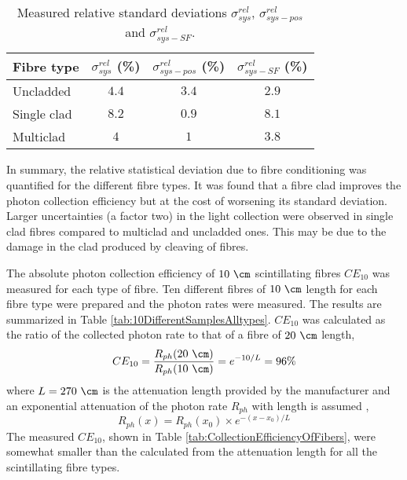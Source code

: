 \begin{table}[htbp]
\centering{}%
\begin{tabular}{lccc}
\toprule 
Fibre type & $\sigma^{rel}_{sys}$ (\%) & $\sigma^{rel}_{sys-pos}$ (\%) & $\sigma^{rel}_{sys-SF}$ (\%) \tabularnewline
\midrule
\midrule 
Uncladded & $4.4$ & $3.4$ & $2.9$ \tabularnewline
Single clad & $8.2$ & $0.9$ & $8.1$ \tabularnewline
Multiclad & $4$ & $1$ & $3.8$ \tabularnewline
\bottomrule
\end{tabular}
\caption{Measured relative standard deviations $\sigma^{rel}_{sys}$, $\sigma^{rel}_{sys-pos}$ and $\sigma^{rel}_{sys-SF}$.}
\label{tab:RelativeStandardDeviations}
\end{table}

In summary, the relative statistical deviation due to fibre conditioning was quantified for the different fibre types. It was found that a fibre clad improves the photon collection efficiency but at the cost of worsening its standard deviation. Larger uncertainties (a factor two) in the light collection were observed in single clad fibres compared to multiclad and uncladded ones. This may be due to the damage in the clad produced by cleaving of fibres. %

The absolute photon collection efficiency of $10~\cm$ scintillating fibres $CE_{10}$ was measured for each type of fibre. Ten different fibres of $10~\cm$ length for each fibre type were prepared and the photon rates were measured. The results are summarized in Table \ref{tab:10DifferentSamplesAlltypes}. $CE_{10}$ was calculated as the ratio of the collected photon rate to that of a fibre of $20~\cm$ length, 
\begin{equation}
CE_{10}=\frac{R_{ph}(20~\cm)}{R_{ph}(10~\cm)}=e^{-10/L}=96\%
\label{eq:CollectionEfficiency}
\end{equation}
where $L=270~\cm$ is the attenuation length provided by the manufacturer and an exponential attenuation of the photon rate $R_{ph}$ with length is assumed \cite{Leo},
\begin{equation}
R_{ph}(x) = R_{ph}(x_0) \times e^{-(x-x_0)/L}
\label{eq:ExponentialAttenuation}
\end{equation}
The measured $CE_{10}$, shown in Table \ref{tab:CollectionEfficiencyOfFibers}, were somewhat smaller than the calculated from the attenuation length for all the scintillating fibre types.

